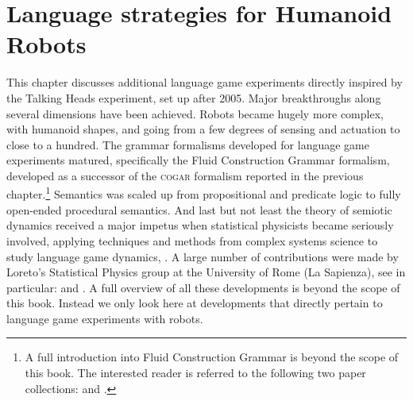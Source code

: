 \chapter{Language strategies for Humanoid Robots}

This chapter discusses additional language game experiments directly inspired by the Talking Heads experiment, 
set up after 2005. Major breakthroughs along several dimensions have been achieved. Robots became hugely 
more complex, with humanoid shapes, and going from a few degrees of sensing and actuation to close to a hundred. The grammar 
formalisms developed for language game experiments matured, specifically the Fluid Construction Grammar formalism, developed 
as a successor of the \textsc{cogar} formalism reported in the previous chapter.\footnote{
A full introduction into Fluid Construction Grammar  
is beyond the scope of this book. The interested reader is 
referred to the following two paper collections: \cite{Steels:2011} and \cite{Steels:2012}.}
Semantics was scaled up from propositional and predicate logic to fully open-ended procedural semantics.
And last but not least the theory of semiotic dynamics received a major impetus when statistical physicists became seriously 
involved, applying techniques and methods from complex systems science to study language game
dynamics, \cite{Loreto:2007}. 
A large number of contributions were made by Loreto's Statistical Physics group at the University of Rome (La Sapienza), 
see in particular: \cite{DallaAsta:2006} and \cite{Baronchelli:2012}.
A full overview of all these developments is beyond the 
scope of this book. Instead we only look here at developments that directly pertain to language game experiments with robots. 

